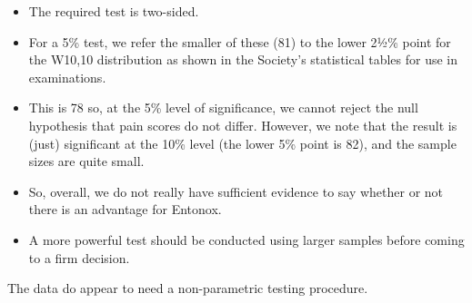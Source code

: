 \documentclass[a4paper,12pt]{article}
\begin{document}
\begin{enumerate}
\begin{itemize} 
\item  The required test is two-sided.  
\item For a 5\% test, we refer the smaller of these (81) to the lower 2½\% point for the W10,10 distribution as shown in the Society's statistical tables for use in examinations. 
\item This is 78 so, at the 5\% level of significance, we cannot reject the null hypothesis that pain scores do not differ.  However, we note that the result is (just) significant at the 10\% level (the lower 5\% point is 82), and the sample sizes are quite small.
\item So, overall, we do not really have sufficient evidence to say whether or not there is an advantage for Entonox. 
\item A more powerful test should be conducted using larger samples before coming to a firm decision. 
\end{itemize}
The data do appear to need a non-parametric testing procedure. 
 \end{enumerate}
 
\end{document}
